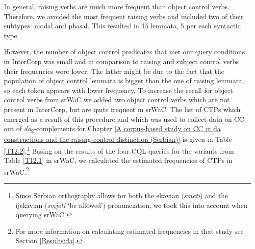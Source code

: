 In general, raising verbs are much more frequent than object control verbs. Therefore, we avoided the most frequent raising verbs and included two of their subtypes: modal and phasal. This resulted in 15 lemmata, 5 per each syntactic type. 

\largerpage
However, the number of object control predicates that met our query conditions in InterCorp was small and in comparison to raising and subject control verbs their frequencies were lower. The latter might be due to the fact that the population of object control lemmata is bigger than the one of raising lemmata, so each token appears with lower frequency. To increase the recall for object control verbs from srWaC we added two object control verbs which are not present in InterCorp, but are quite frequent in srWaC. The list of CTPs which emerged as a result of this procedure and which was used to collect data on CC out of \textit{da}\textsubscript{2}-complements for Chapter \ref{A corpus-based study on CC in da constructions and the raising-control distinction (Serbian)} is given in Table \ref{T12.2}.\footnote{Since Serbian orthography allows for both the ekavian (\textit{smeti}) and the ijekavian (\textit{smjeti} ‘be allowed’) pronunciation, we took this into account when querying srWaC.} Basing on the results of the four CQL queries for the variants from Table \ref{T12.1} in srWaC, we calculated the estimated frequencies of CTPs in srWaC.\footnote{For more information on calculating estimated frequencies in that study see Section \ref{Results:da}.}

